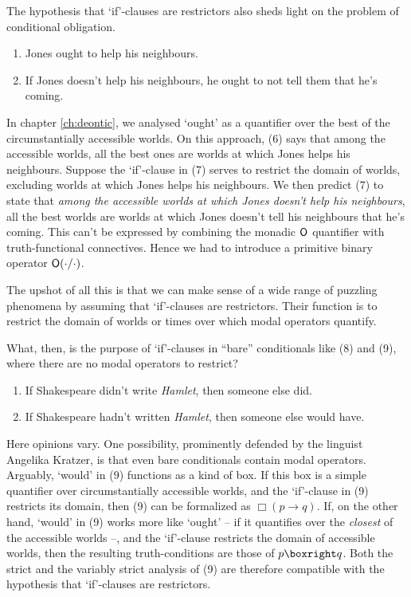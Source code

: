 The hypothesis that `if'-clauses are restrictors also sheds light on the problem
of conditional obligation.
\begin{enumerate}[leftmargin=10mm]
  \itemsep-1mm  
  \item[(6)] Jones ought to help his neighbours.
  \item[(7)] If Jones doesn't help his neighbours, he ought to not tell them that he's coming.
\end{enumerate}
In chapter \ref{ch:deontic}, we analysed `ought' as a quantifier over the best
of the circumstantially accessible worlds. On this approach, (6) says that among
the accessible worlds, all the best ones are worlds at which Jones helps his
neighbours. Suppose the `if'-clause in (7) serves to restrict the domain of
worlds, excluding worlds at which Jones helps his neighbours. We then predict
(7) to state that \emph{among the accessible worlds at which Jones doesn't help
  his neighbours}, all the best worlds are worlds at which Jones doesn't tell
his neighbours that he's coming. This can't be expressed by combining the
monadic $\operatorname{\mathsf{O}}$ quantifier with truth-functional connectives. Hence we had to
introduce a primitive binary operator $\operatorname{\mathsf{O}}(\cdot/\cdot)$.


The upshot of all this is that we can make sense of a wide range of puzzling
phenomena by assuming that `if'-clauses are restrictors. Their function is to
restrict the domain of worlds or times over which modal operators quantify.

What, then, is the purpose of `if'-clauses in ``bare'' conditionals like (8) and
(9), where there are no modal operators to restrict?
\begin{enumerate}[leftmargin=10mm]
  \itemsep-1mm
  \item[(8)] If Shakespeare didn't write \emph{Hamlet}, then someone else did.
  \item[(9)] If Shakespeare hadn't written \emph{Hamlet}, then someone else
        would have.
\end{enumerate}

Here opinions vary. One possibility, prominently defended by the linguist
Angelika Kratzer, is that even bare conditionals contain modal operators.
Arguably, `would' in (9) functions as a kind of box. If this box is a simple
quantifier over circumstantially accessible worlds, and the `if'-clause in (9)
restricts its domain, then (9) can be formalized as $\Box(p \to q)$. If, on the
other hand, `would' in (9) works more like `ought' -- if it quantifies over the
\emph{closest} of the accessible worlds --, and the `if'-clause restricts the
domain of accessible worlds, then the resulting truth-conditions are those of
$p \boxright q$. Both the strict and the variably strict analysis of (9) are
therefore compatible with the hypothesis that `if'-clauses are restrictors.

